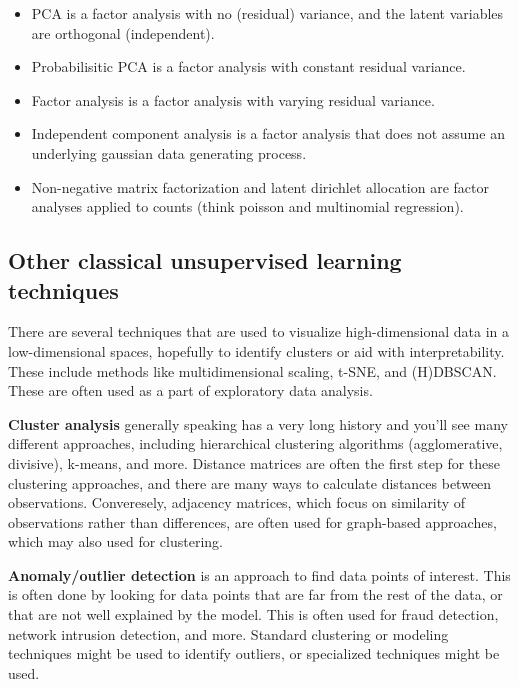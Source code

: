 \documentclass[
  letterpaper,
]{krantz}
\providecommand{\tightlist}{%
  \setlength{\itemsep}{0pt}\setlength{\parskip}{0pt}}\usepackage{longtable,booktabs,array}
\begin{document}
\begin{itemize}
\tightlist
\item
  PCA is a factor analysis with no (residual) variance, and the latent
  variables are orthogonal (independent).
\item
  Probabilisitic PCA is a factor analysis with constant residual
  variance.
\item
  Factor analysis is a factor analysis with varying residual variance.
\item
  Independent component analysis is a factor analysis that does not
  assume an underlying gaussian data generating process.
\item
  Non-negative matrix factorization and latent dirichlet allocation are
  factor analyses applied to counts (think poisson and multinomial
  regression).
\end{itemize}

\subsection{Other classical unsupervised learning
techniques}\label{other-classical-unsupervised-learning-techniques}

There are several techniques that are used to visualize high-dimensional
data in a low-dimensional spaces, hopefully to identify clusters or aid
with interpretability. These include methods like multidimensional
scaling, t-SNE, and (H)DBSCAN. These are often used as a part of
exploratory data analysis.

\textbf{Cluster analysis} generally speaking has a very long history and
you'll see many different approaches, including hierarchical clustering
algorithms (agglomerative, divisive), k-means, and more. Distance
matrices are often the first step for these clustering approaches, and
there are many ways to calculate distances between observations.
Converesely, adjacency matrices, which focus on similarity of
observations rather than differences, are often used for graph-based
approaches, which may also used for clustering.

\textbf{Anomaly/outlier detection} is an approach to find data points of
interest. This is often done by looking for data points that are far
from the rest of the data, or that are not well explained by the model.
This is often used for fraud detection, network intrusion detection, and
more. Standard clustering or modeling techniques might be used to
identify outliers, or specialized techniques might be used.
\end{document}

